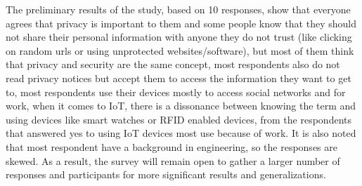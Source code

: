 \documentclass[conference]{IEEEtran}
\begin{document}
The preliminary results of the study, based on 10 responses, show that everyone
agrees that privacy is important to them and some people know that they
should not share their personal information with anyone they do not trust
(like clicking on random urls or using unprotected websites/software), but
most of them think that privacy and security are the same concept, most
respondents also do not read privacy notices but accept them to access the
information they want to get to, most respondents use their devices mostly
to access social networks and for work, when it comes to IoT, there is a
dissonance between knowing the term and using devices like smart watches
or RFID enabled devices, from the respondents that answered yes to using
IoT devices most use because of work. It is also noted that most respondent
have a background in engineering, so the responses are skewed. As a result,
the survey will remain open to gather a larger number of responses and participants
for more significant results and generalizations.
\end{document}
